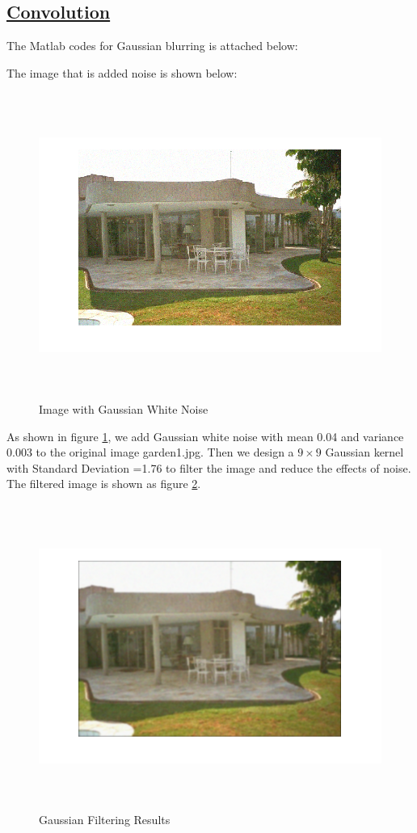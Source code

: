 \documentclass[letterpaper]{article}
\begin{document}
\subsection*{\underline{Convolution}}
The Matlab codes for Gaussian blurring is attached below:

The image that is added noise is shown below:
\begin{figure}[H]
\centering
\includegraphics[width=12cm, height=10cm]{midterm/add_noise.png}
\caption{Image with Gaussian White Noise}
\label{noise}
\end{figure}
As shown in figure \ref{noise}, we add Gaussian white noise with mean 0.04 and variance 0.003 to the original image garden1.jpg. Then we design a $9\times 9$ Gaussian kernel with Standard Deviation =1.76 to filter the image and reduce the effects of noise. The filtered image is shown as figure \ref{gaussian}.
\begin{figure}[H]
\centering
\includegraphics[width=12cm, height=10cm]{midterm/gaussian_blur.png}
\caption{Gaussian Filtering Results}
\label{gaussian}
\end{figure}
\end{document}
